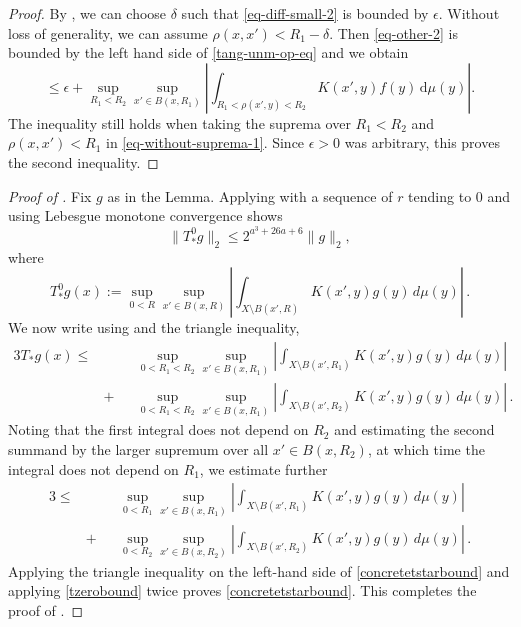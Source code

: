\begin{proof}
By , we can choose $\delta$ such that \eqref{eq-diff-small-2} is bounded by $\epsilon$. Without loss of generality, we can assume $\rho(x,x')<R_1-\delta$. Then \eqref{eq-other-2} is bounded by the left hand side of \eqref{tang-unm-op-eq} and we obtain
\begin{equation*}
    \le \epsilon + \sup_{R_1 < R_2} \sup_{x'\in B(x,R_1)} \left|\int_{R_1<\rho(x',y)<R_2} K(x',y) f(y) \, \mathrm{d}\mu(y) \right| .
\end{equation*}
The inequality still holds when taking the suprema over $R_1<R_2$ and $\rho(x,x')<R_1$ in \eqref{eq-without-suprema-1}. Since $\epsilon>0$ was arbitrary, this proves the second inequality.
\end{proof}

\begin{proof}[Proof of ]
\leanok
Fix $g$ as in the Lemma.
Applying  with a
sequence of $r$ tending to $0$ and using Lebesgue monotone convergence shows
\begin{equation}\label{tzerobound}
    \|T_*^{0}g\|_2\le 2^{a^3+26a+6}\|g\|_2,
\end{equation}
where
\begin{equation}\label{eq-simpler--nontangential}
    T_*^{0} g(x):=\sup_{0<R}\sup_{x'\in B(x,R)} \left|\int_{X\setminus B(x',R)}
K(x',y) g(y)\, d\mu(y)\right|\, .
\end{equation}
We now write using  and the triangle inequality,
\begin{alignat*}{3}\label{concretetstartriangle}
    T_* g(x)\le&&&\sup_{0<R_1<R_2}\sup_{x'\in B(x,R_1)} \left|\int_{X\setminus B(x',R_1)}K(x',y) g(y)\, d\mu(y)\right| \\
&+&&\sup_{0<R_1<R_2}\sup_{x'\in B(x,R_1)} \left|\int_{X\setminus B(x',R_2)} K(x',y) g(y)\, d\mu(y)\right|\, .
\end{alignat*}
Noting that the first integral does not depend on $R_2$ and
estimating the second summand by the larger supremum over all
$x'\in B(x,R_2)$, at which time the integral does not depend on $R_1$, we estimate further
\begin{alignat*}{3}
    \le&&&\sup_{0<R_1}\sup_{x'\in B(x,R_1)} \left|\int_{X\setminus B(x',R_1)}K(x',y) g(y)\, d\mu(y)\right| \\
    &+  &&\sup_{0<R_2}\sup_{x'\in B(x,R_2)} \left|\int_{X\setminus B(x',R_2)} K(x',y) g(y)\, d\mu(y)\right|\, .
\end{alignat*}
    Applying the triangle inequality on the left-hand side
    of \eqref{concretetstarbound} and applying
     \eqref{tzerobound} twice
    proves \eqref{concretetstarbound}.
    This completes the proof of .
\end{proof}






